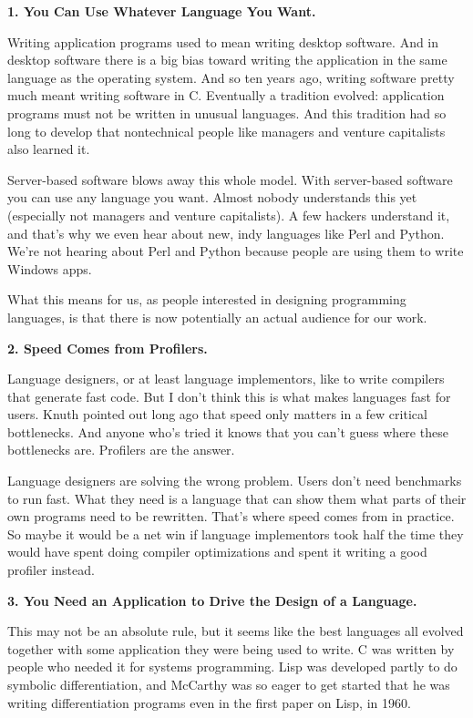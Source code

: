 \textbf{1. You Can Use Whatever Language You Want.}

Writing application programs used to mean writing desktop software. And
in desktop software there is a big bias toward writing the application
in the same language as the operating system. And so ten years ago,
writing software pretty much meant writing software in C. Eventually a
tradition evolved: application programs must not be written in unusual
languages. And this tradition had so long to develop that nontechnical
people like managers and venture capitalists also learned it.

Server-based software blows away this whole model. With server-based
software you can use any language you want. Almost nobody understands
this yet (especially not managers and venture capitalists). A few
hackers understand it, and that's why we even hear about new, indy
languages like Perl and Python. We're not hearing about Perl and Python
because people are using them to write Windows apps.

What this means for us, as people interested in designing programming
languages, is that there is now potentially an actual audience for our
work.

\textbf{2. Speed Comes from Profilers.}

Language designers, or at least language implementors, like to write
compilers that generate fast code. But I don't think this is what makes
languages fast for users. Knuth pointed out long ago that speed only
matters in a few critical bottlenecks. And anyone who's tried it knows
that you can't guess where these bottlenecks are. Profilers are the
answer.

Language designers are solving the wrong problem. Users don't need
benchmarks to run fast. What they need is a language that can show them
what parts of their own programs need to be rewritten. That's where
speed comes from in practice. So maybe it would be a net win if language
implementors took half the time they would have spent doing compiler
optimizations and spent it writing a good profiler instead.

\textbf{3. You Need an Application to Drive the Design of a Language.}

This may not be an absolute rule, but it seems like the best languages
all evolved together with some application they were being used to
write. C was written by people who needed it for systems programming.
Lisp was developed partly to do symbolic differentiation, and McCarthy
was so eager to get started that he was writing differentiation programs
even in the first paper on Lisp, in 1960.

